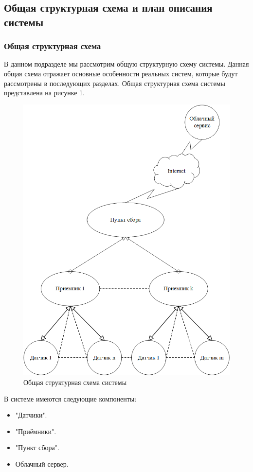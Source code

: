 \subsection{Общая структурная схема и план описания системы}
\subsubsection{Общая структурная схема}\label{7.1}
В данном подразделе мы рассмотрим общую структурную схему системы. Данная общая схема отражает основные особенности реальных систем, которые будут рассмотрены в последующих разделах.
Общая структурная схема системы представлена на рисунке 
\ref{fig:common_chart}.

\begin{figure}[h]
	\centering\includegraphics[width=0.7\linewidth]{img/common_chart}
	\caption{Общая структурная схема системы}
	\label{fig:common_chart}
\end{figure}

В системе имеются следующие компоненты: 
\begin{itemize}
	\item "Датчики".
	\item "Приёмники". 
	\item "Пункт сбора".
	\item Облачный сервер.
\end{itemize}

